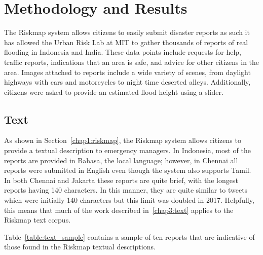 \chapter{Methodology and Results}
The Riskmap system allows citizens to easily submit
disaster reports as such it has allowed the Urban Risk Lab at
MIT to gather thousands of reports of real flooding in Indonesia and India.
These data points include requests for help, traffic reports, indications that an
area is safe, and advice for other citizens in the area. Images attached to
reports include a wide variety of scenes, from daylight highways with cars and
motorcycles to night time deserted alleys. Additionally, citizens were asked to
provide an estimated flood height using a slider.

\section{Text}
As shown in Section~\ref{chap1:riskmap}, the Riskmap system allows citizens to provide
a textual description to emergency managers. In Indonesia, most of the reports
are provided in Bahasa, the local language; however, in Chennai all reports were
submitted in English even though the system also supports Tamil. In both Chennai
and Jakarta these reports are quite brief, with the longest reports having 140
characters. In this manner, they are quite similar to tweets which were
initially 140 characters but this limit was doubled in 2017. Helpfully, this
means that much of the work described in~\ref{chap3:text} applies to the Riskmap
text corpus.

Table~\ref{table:text_sample} contains a sample of ten reports that are
indicative of those found in the Riskmap textual descriptions.

